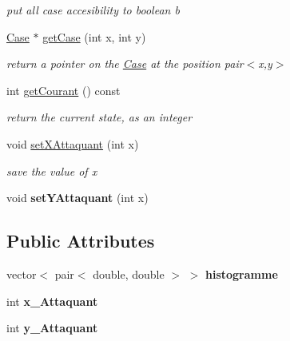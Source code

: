 \begin{DoxyCompactItemize}
\begin{DoxyCompactList}\small\item\em put all case accesibility to boolean b \item\end{DoxyCompactList}\item 
\hyperlink{class_case}{Case} $\ast$ \hyperlink{class_moteur_jeu_a66bfae2f68f0f1c3998d33aad61ed395}{getCase} (int x, int y)
\begin{DoxyCompactList}\small\item\em return a pointer on the \hyperlink{class_case}{Case} at the position pair$<$x,y$>$ \item\end{DoxyCompactList}\item 
int \hyperlink{class_moteur_jeu_a7b227edf142c1823d60d43c3420c115f}{getCourant} () const 
\begin{DoxyCompactList}\small\item\em return the current state, as an integer \item\end{DoxyCompactList}\item 
void \hyperlink{class_moteur_jeu_a088e9616650b680346d95eca464b859f}{setXAttaquant} (int x)
\begin{DoxyCompactList}\small\item\em save the value of x \item\end{DoxyCompactList}\item 
\hypertarget{class_moteur_jeu_aefb5f4a59d95b0f87393de292073dba8}{
void {\bfseries setYAttaquant} (int x)}
\label{class_moteur_jeu_aefb5f4a59d95b0f87393de292073dba8}

\end{DoxyCompactItemize}
\subsection*{Public Attributes}
\begin{DoxyCompactItemize}
\item 
\hypertarget{class_moteur_jeu_a94975baba1addaec2e3716ae5bc6fb4e}{
vector$<$ pair$<$ double, double $>$ $>$ {\bfseries histogramme}}
\label{class_moteur_jeu_a94975baba1addaec2e3716ae5bc6fb4e}

\item 
\hypertarget{class_moteur_jeu_a2eaad3ffb0fa2db0d72312f33e3d8f7d}{
int {\bfseries x\_\-Attaquant}}
\label{class_moteur_jeu_a2eaad3ffb0fa2db0d72312f33e3d8f7d}

\item 
\hypertarget{class_moteur_jeu_aeaf3842987f4492b3e1053db4302833f}{
int {\bfseries y\_\-Attaquant}}
\label{class_moteur_jeu_aeaf3842987f4492b3e1053db4302833f}

\end{DoxyCompactItemize}


